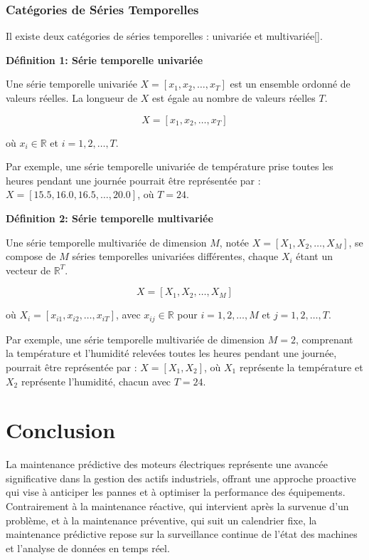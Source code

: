 \subsubsection{Catégories de Séries Temporelles}

Il existe deux catégories de séries temporelles : univariée et
multivariée[\cite{fawaz2019deep}].

\textbf{Définition 1: Série temporelle univariée}

Une série temporelle univariée $X = [x_1, x_2, \ldots, x_T]$ est un ensemble
ordonné de valeurs réelles. La longueur de $X$ est égale au nombre de valeurs
réelles $T$.

\begin{equation}
	X = [x_1, x_2, \ldots, x_T]
\end{equation}

où $x_i \in \mathbb{R}$ et $i = 1, 2, \ldots, T$.

Par exemple, une série temporelle univariée de température prise toutes les
heures pendant une journée pourrait être représentée par : $X = [15.5, 16.0,
	16.5, \ldots, 20.0]$, où $T = 24$.

\textbf{Définition 2: Série temporelle multivariée}

Une série temporelle multivariée de dimension $M$, notée $X = [X_1, X_2,
	\ldots, X_M]$, se compose de $M$ séries temporelles univariées différentes,
chaque $X_i$ étant un vecteur de $\mathbb{R}^T$.

\begin{equation}
	X = [X_1, X_2, \ldots, X_M]
\end{equation}

où $X_i = [x_{i1}, x_{i2}, \ldots, x_{iT}]$, avec $x_{ij} \in \mathbb{R}$ pour
$i = 1, 2, \ldots, M$ et $j = 1, 2, \ldots, T$.

Par exemple, une série temporelle multivariée de dimension $M=2$, comprenant la
température et l'humidité relevées toutes les heures pendant une journée,
pourrait être représentée par : $X = [X_1, X_2]$, où $X_1$ représente la
température et $X_2$ représente l'humidité, chacun avec $T = 24$.

\section{Conclusion}

La maintenance prédictive des moteurs électriques représente une avancée
significative dans la gestion des actifs industriels, offrant une approche
proactive qui vise à anticiper les pannes et à optimiser la performance des
équipements. Contrairement à la maintenance réactive, qui intervient après la
survenue d’un problème, et à la maintenance préventive, qui suit un calendrier
fixe, la maintenance prédictive repose sur la surveillance continue de l’état
des machines et l’analyse de données en temps réel.

